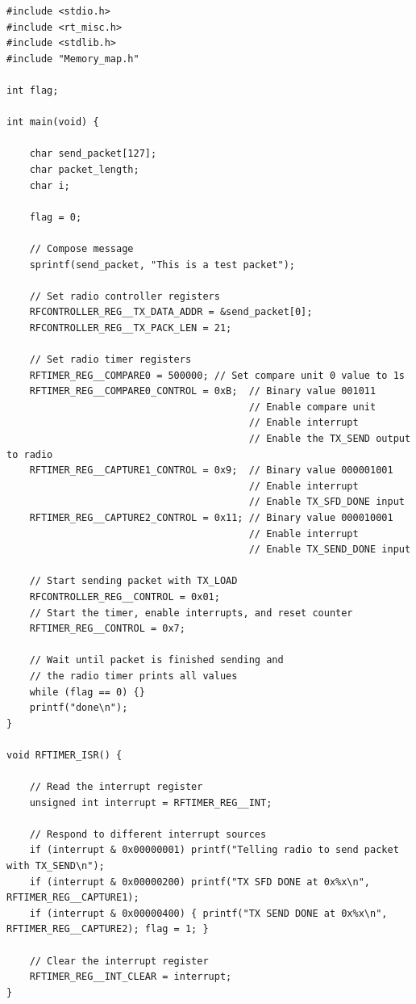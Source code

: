 \begin{lstlisting}
#include <stdio.h>
#include <rt_misc.h>
#include <stdlib.h>
#include "Memory_map.h"

int flag;

int main(void) {

    char send_packet[127];
    char packet_length;
    char i;
    
    flag = 0;

    // Compose message
    sprintf(send_packet, "This is a test packet");

    // Set radio controller registers
    RFCONTROLLER_REG__TX_DATA_ADDR = &send_packet[0];
    RFCONTROLLER_REG__TX_PACK_LEN = 21;

    // Set radio timer registers
    RFTIMER_REG__COMPARE0 = 500000; // Set compare unit 0 value to 1s
    RFTIMER_REG__COMPARE0_CONTROL = 0xB;  // Binary value 001011
                                          // Enable compare unit
                                          // Enable interrupt
                                          // Enable the TX_SEND output to radio
    RFTIMER_REG__CAPTURE1_CONTROL = 0x9;  // Binary value 000001001
                                          // Enable interrupt
                                          // Enable TX_SFD_DONE input
    RFTIMER_REG__CAPTURE2_CONTROL = 0x11; // Binary value 000010001
                                          // Enable interrupt
                                          // Enable TX_SEND_DONE input

    // Start sending packet with TX_LOAD
    RFCONTROLLER_REG__CONTROL = 0x01;
    // Start the timer, enable interrupts, and reset counter
    RFTIMER_REG__CONTROL = 0x7;

    // Wait until packet is finished sending and
    // the radio timer prints all values
    while (flag == 0) {}
    printf("done\n");
}

void RFTIMER_ISR() {

    // Read the interrupt register
    unsigned int interrupt = RFTIMER_REG__INT;

    // Respond to different interrupt sources
    if (interrupt & 0x00000001) printf("Telling radio to send packet with TX_SEND\n");
    if (interrupt & 0x00000200) printf("TX SFD DONE at 0x%x\n", RFTIMER_REG__CAPTURE1);
    if (interrupt & 0x00000400) { printf("TX SEND DONE at 0x%x\n", RFTIMER_REG__CAPTURE2); flag = 1; }

    // Clear the interrupt register
    RFTIMER_REG__INT_CLEAR = interrupt;
}
\end{lstlisting}

